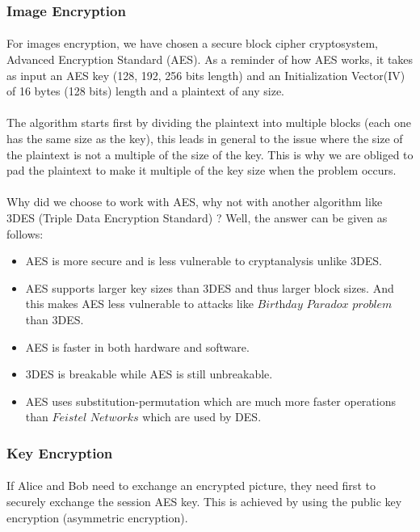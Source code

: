       \subsubsection{Image Encryption}
	\paragraph{}
	For images encryption, we have chosen a secure block cipher cryptosystem, Advanced Encryption Standard (AES). As a reminder of how AES works, it takes as input an AES key (128, 192, 256 bits length) and an Initialization Vector(IV) of 16 bytes (128 bits) length and a plaintext of any size.
	\paragraph{}
	The algorithm starts first by dividing the plaintext into multiple blocks (each one has the same size as the key), this leads in general to the issue where the size of the plaintext is not a multiple of the size of the key. This is why we are obliged to pad the plaintext to make it multiple of the key size when the problem occurs.
	\paragraph{}
	Why did we choose to work with AES, why not with another algorithm like 3DES (Triple Data Encryption Standard) ? Well, the answer can be given as follows:
	\begin{itemize}
	 \item AES is more secure and is less vulnerable to cryptanalysis unlike 3DES.
	 \item AES supports larger key sizes than 3DES and thus larger block sizes. And this makes AES less vulnerable to attacks like $\textit{Birthday Paradox problem}$ than 3DES.
	 \item AES is faster in both hardware and software.
	 \item 3DES is breakable while AES is still unbreakable.
	 \item AES uses substitution-permutation which are much more faster operations than $\textit{Feistel Networks}$ which are used by DES.
	\end{itemize}

	
	\subsubsection{Key Encryption}
	\paragraph{}
	  If Alice and Bob need to exchange an encrypted picture, they need first to securely exchange the session AES key. This is achieved by using the public key encryption (asymmetric encryption).
